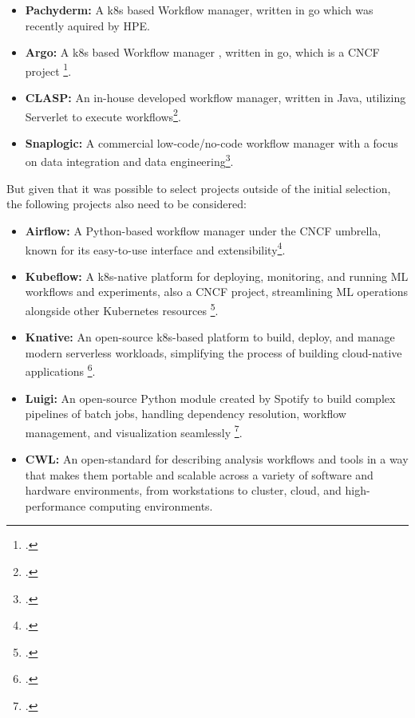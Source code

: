 \begin{itemize}
    \item \textbf{Pachyderm:} A \ac{k8s} based Workflow manager, written in go which was recently aquired by \ac{HPE}.
    \item \textbf{Argo:} A \ac{k8s} based Workflow manager , written in go, which is a \ac{CNCF} project \footcite{ArgoprojArgoworkflows2023}.
    \item \textbf{\ac{CLASP}:}  An in-house developed workflow manager, written in Java, utilizing Serverlet to execute workflows\footcite{sayersCloudApplicationServices2015}.
    \item \textbf{Snaplogic:} A commercial low-code/no-code workflow manager with a focus on data integration and data engineering\footcite{IPaaSSolutionEnterprise}.
\end{itemize}

But given that it was possible to select projects outside of the initial selection, the following projects also need to be considered:


\begin{itemize}
    \item \textbf{Airflow:} A Python-based workflow manager under the \ac{CNCF} umbrella, known for its easy-to-use interface and extensibility\footcite{hainesWorkflowOrchestrationApache2022}.
    \item \textbf{Kubeflow:} A \ac{k8s}-native platform for deploying, monitoring, and running ML workflows and experiments, also a \ac{CNCF} project, streamlining \ac{ML} operations alongside other Kubernetes resources \footcite{Kubeflow}.
    \item \textbf{Knative:} An open-source \ac{k8s}-based platform to build, deploy, and manage modern serverless workloads, simplifying the process of building cloud-native applications \footcite{HomeKnative}.
    \item \textbf{Luigi:} An open-source Python module created by Spotify to build complex pipelines of batch jobs, handling dependency resolution, workflow management, and visualization seamlessly \footcite{LuigiDocWorkflows}.
    \item \textbf{\ac{CWL}:} An open-standard for describing analysis workflows and tools in a way that makes them portable and scalable across a variety of software and hardware environments, from workstations to cluster, cloud, and high-performance computing environments.
\end{itemize}
    

